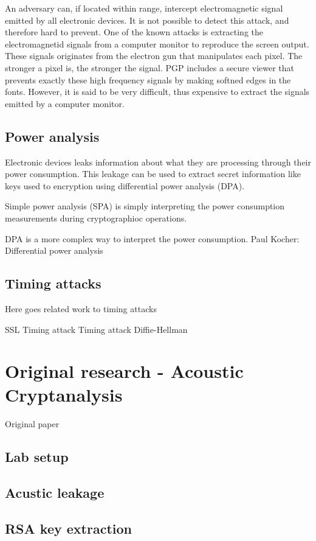 An adversary can, if located within range, intercept electromagnetic signal emitted by all electronic devices. 
It is not possible to detect this attack, and therefore hard to prevent. 
One of the known attacks is extracting the electromagnetid signals from a computer monitor to reproduce the screen output.
These signals originates from the electron gun that manipulates each pixel\cite{tempest_sans}. 
The stronger a pixel is, the stronger the signal.
PGP includes a secure viewer that prevents exactly these high frequency signals by making softned edges in the fonts.
However, it is said to be very difficult, thus expensive to extract the signals emitted by a computer monitor. 

\subsection{Power analysis}\label{sec:power_analysis}

Electronic devices leaks information about what they are processing through their power consumption.
This leakage can be used to extract secret information like keys used to encryption using differential power analysis (DPA). 

Simple power analysis (SPA) is simply interpreting the power consumption measurements during cryptographioc operations\cite{dpa_kocher}. 

DPA is a more complex way to interpret the power consumption. 
Paul Kocher: Differential power analysis \cite{dpa_kocher}

\subsection{Timing attacks}\label{sec:timing_attacks}

Here goes related work to timing attacks

SSL Timing attack \cite{ssl_timing_attack}
Timing attack Diffie-Hellman \cite{timing_attack_kocher}

\section{Original research - Acoustic Cryptanalysis}\label{sec:original_research}

Original paper \cite{original_paper}

\subsection{Lab setup}\label{sec:lab_setup}
\subsection{Acustic leakage}\label{sec:acustic_leakage}
\subsection{RSA key extraction}\label{sec:rsa_key_extraction}
